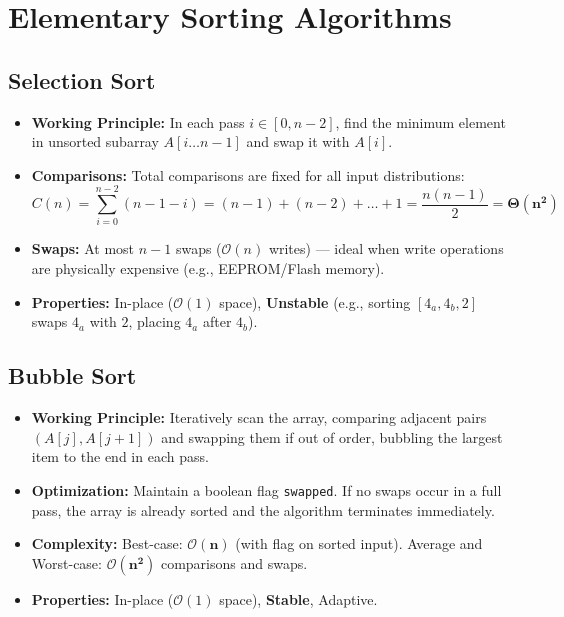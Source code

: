 \documentclass[12pt,a4paper]{article}
\begin{document}
\section{Elementary Sorting Algorithms}

\subsection{Selection Sort}
\begin{itemize}[leftmargin=*, itemsep=3pt]
  \item \textbf{Working Principle:} In each pass $i \in [0, n-2]$, find the minimum element in unsorted subarray $A[i \dots n-1]$ and swap it with $A[i]$.
  \item \textbf{Comparisons:} Total comparisons are fixed for all input distributions:
  \begin{equation}
    C(n) = \sum_{i=0}^{n-2} (n - 1 - i) = (n - 1) + (n - 2) + \dots + 1 = \frac{n(n - 1)}{2} = \mathbf{\Theta(n^2)}
  \end{equation}
  \item \textbf{Swaps:} At most $n - 1$ swaps ($\mathcal{O}(n)$ writes) --- ideal when write operations are physically expensive (e.g., EEPROM/Flash memory).
  \item \textbf{Properties:} In-place ($\mathcal{O}(1)$ space), \textbf{Unstable} (e.g., sorting $[4_a, 4_b, 2]$ swaps $4_a$ with $2$, placing $4_a$ after $4_b$).
\end{itemize}

\subsection{Bubble Sort}
\begin{itemize}[leftmargin=*, itemsep=3pt]
  \item \textbf{Working Principle:} Iteratively scan the array, comparing adjacent pairs $(A[j], A[j+1])$ and swapping them if out of order, bubbling the largest item to the end in each pass.
  \item \textbf{Optimization:} Maintain a boolean flag \texttt{swapped}. If no swaps occur in a full pass, the array is already sorted and the algorithm terminates immediately.
  \item \textbf{Complexity:} Best-case: $\mathbf{\mathcal{O}(n)}$ (with flag on sorted input). Average and Worst-case: $\mathbf{\mathcal{O}(n^2)}$ comparisons and swaps.
  \item \textbf{Properties:} In-place ($\mathcal{O}(1)$ space), \textbf{Stable}, Adaptive.
\end{itemize}
\end{document}
